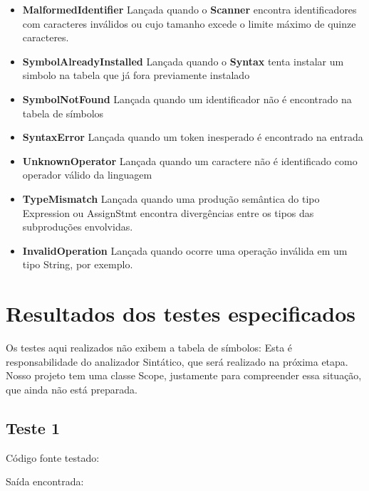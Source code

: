 \documentclass[11pt]{article}
\begin{document}
		\begin{itemize}
			
			\item \textbf{MalformedIdentifier} Lançada quando o \textbf{Scanner} encontra identificadores com caracteres inválidos
			ou cujo tamanho excede o limite máximo de quinze caracteres.
			
			\item \textbf{SymbolAlreadyInstalled} Lançada quando o \textbf{Syntax} tenta instalar um simbolo na tabela que já
			fora previamente instalado
			
			\item \textbf{SymbolNotFound} Lançada quando um identificador não é encontrado na tabela de símbolos
			
			\item \textbf{SyntaxError} Lançada quando um token inesperado é encontrado na entrada
			
			\item \textbf{UnknownOperator} Lançada quando um caractere não é identificado como operador válido da linguagem
			
			\item \textbf{TypeMismatch} Lançada quando uma produção semântica do tipo Expression ou AssignStmt encontra divergências entre os tipos das subproduções envolvidas.
			
			\item \textbf{InvalidOperation} Lançada quando ocorre uma operação inválida em um tipo String, por exemplo. 
		\end{itemize}
		
  
\section{Resultados dos testes especificados}

	Os testes aqui realizados não exibem a tabela de símbolos: Esta é responsabilidade do analizador Sintático, que será realizado na próxima etapa.
	Nosso projeto tem uma classe Scope, justamente para compreender essa situação, que ainda não está preparada.


	\subsection{Teste 1}
	
		Código fonte testado:
		
			
		Saída encontrada:
		
	
\end{document}
